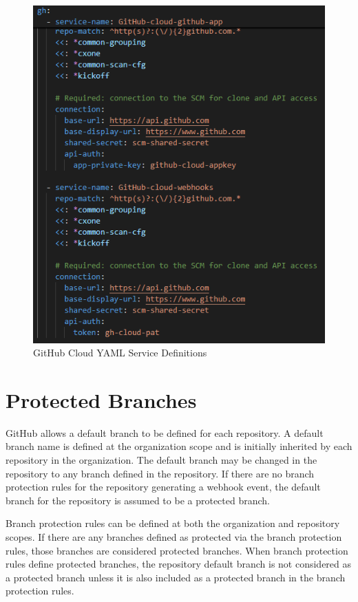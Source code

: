 \begin{figure}[h]
    \includegraphics[scale=1]{graphics/gh-cloud-yaml.png}
    \centering
    \caption{GitHub Cloud YAML Service Definitions}
    \label{fig:gh-cloud-yaml}
\end{figure}


\section{Protected Branches}

GitHub allows a default branch to be defined for each repository.  A default branch name is defined at the organization
scope and is initially inherited by each repository in the organization.  The default branch may be changed in the repository
to any branch defined in the repository. If there are no branch protection rules for the repository generating a webhook event, 
the default branch for the repository is assumed to be a protected branch.

Branch protection rules can be defined at both the organization and repository scopes.  If there are any branches
defined as protected via the branch protection rules, those branches are considered protected branches.  When branch protection
rules define protected branches, the repository default branch is not considered as a protected branch unless it is also included
as a protected branch in the branch protection rules.
